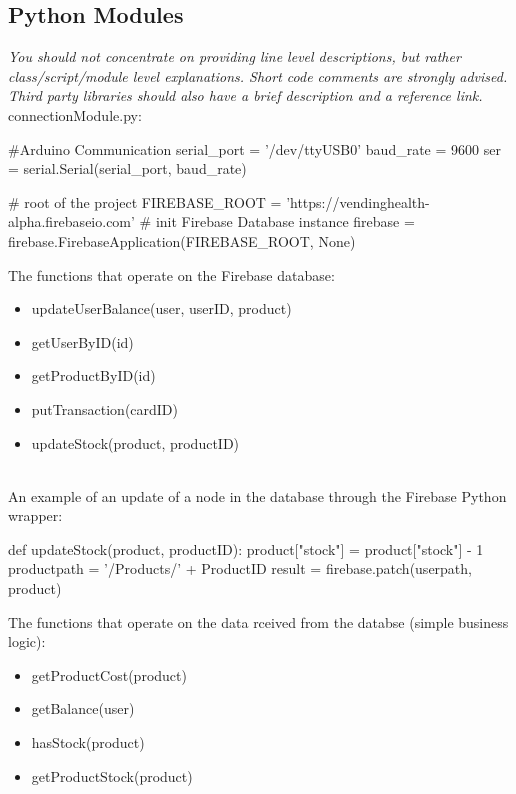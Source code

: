 \documentclass[a4paper,11pt]{article}
\begin{document}
\subsection{Python Modules}
\textit{You should not concentrate on providing line level descriptions, but rather class/script/module level explanations. Short code comments are strongly advised. Third party libraries should also have a brief description and a reference link.}\\

connectionModule.py:  \\

\begin{python}
#Arduino Communication
serial_port = '/dev/ttyUSB0'
baud_rate = 9600
ser = serial.Serial(serial_port, baud_rate)
\end{python}

\begin{python}
# root of the project
FIREBASE_ROOT = 'https://vendinghealth-alpha.firebaseio.com'
# init Firebase Database instance
firebase = firebase.FirebaseApplication(FIREBASE_ROOT, None)
\end{python}

The functions that operate on the Firebase database:
\begin{itemize}
\item updateUserBalance(user, userID, product)
\item getUserByID(id)
\item getProductByID(id)
\item putTransaction(cardID)
\item updateStock(product, productID)\\\\
\end{itemize}

An example of an update of a node in the database through the Firebase Python wrapper:
\begin{python}
def updateStock(product, productID):
	product["stock"] = product["stock"] - 1
	productpath = '/Products/' + ProductID
	result = firebase.patch(userpath, product)
\end{python}

The functions that operate on the data rceived from the databse (simple business logic):
\begin{itemize}
\item getProductCost(product)
\item getBalance(user)
\item hasStock(product)
\item getProductStock(product)\\
\end{itemize}
\end{document}
